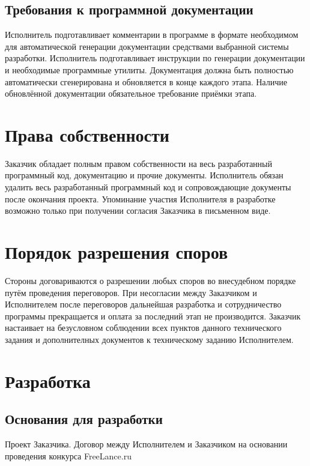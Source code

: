\documentclass[10pt,a4paper]{article}
\begin{document}
\subsection{Требования к программной документации}

Исполнитель подготавливает комментарии в программе в формате необходимом для
автоматической генерации документации средствами выбранной системы разработки.
Исполнитель подготавливает инструкции по генерации документации и необходимые
программные утилиты. Документация должна быть полностью автоматически
сгенерирована и обновляется в конце каждого этапа. Наличие обновлённой
документации обязательное требование приёмки этапа.

\section{Права собственности}

Заказчик обладает полным правом собственности на весь разработанный программный
код, документацию и прочие документы. Исполнитель обязан удалить весь
разработанный программный код и сопровождающие документы после окончания
проекта. Упоминание участия Исполнителя в разработке возможно только при
получении согласия Заказчика в письменном виде.

\section{Порядок разрешения споров}

Стороны договариваются о разрешении любых споров во внесудебном порядке путём
проведения переговоров. При несогласии между Заказчиком и Исполнителем после
переговоров дальнейшая разработка и сотрудничество программы прекращается и
оплата за последний этап не производится. Заказчик настаивает на безусловном
соблюдении всех пунктов данного технического задания и дополнителных документов
к техническому заданию Исполнителем.

\section{Разработка}

\subsection{Основания для разработки}

Проект Заказчика. Договор между Исполнителем и Заказчиком на основании
проведения конкурса FreeLance.ru
\end{document}
